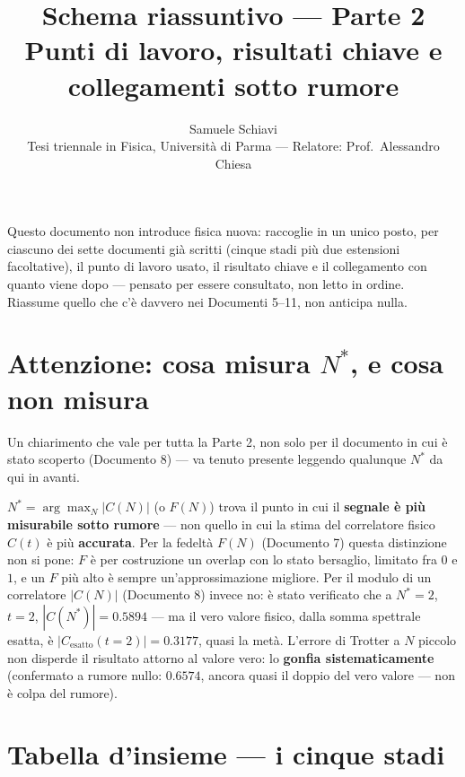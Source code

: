 \documentclass[11pt,a4paper]{article}
\title{\bfseries Schema riassuntivo --- Parte 2\\[2pt]
\large Punti di lavoro, risultati chiave e collegamenti sotto rumore}
\author{Samuele Schiavi \\ \small Tesi triennale in Fisica, Università di Parma
--- Relatore: Prof.\ Alessandro Chiesa}
\date{}
\begin{document}
\maketitle
\thispagestyle{fancy}

Questo documento non introduce fisica nuova: raccoglie in un unico posto,
per ciascuno dei sette documenti già scritti (cinque stadi più due
estensioni facoltative), il punto di lavoro usato, il risultato chiave e
il collegamento con quanto viene dopo --- pensato per essere consultato,
non letto in ordine. Riassume quello che c'è davvero nei Documenti 5--11,
non anticipa nulla.

\section*{Attenzione: cosa misura $N^*$, e cosa non misura}

Un chiarimento che vale per tutta la Parte 2, non solo per il documento in
cui è stato scoperto (Documento 8) --- va tenuto presente leggendo
qualunque $N^*$ da qui in avanti.

$N^*=\arg\max_N|C(N)|$ (o $F(N)$) trova il punto in cui il \textbf{segnale
è più misurabile sotto rumore} --- non quello in cui la stima del
correlatore fisico $C(t)$ è più \textbf{accurata}. Per la fedeltà $F(N)$
(Documento 7) questa distinzione non si pone: $F$ è per costruzione un
overlap con lo stato bersaglio, limitato fra $0$ e $1$, e un $F$ più alto
è sempre un'approssimazione migliore. Per il modulo di un correlatore
$|C(N)|$ (Documento 8) invece no: è stato verificato che a $N^*=2$,
$t=2$, $|C(N^*)|=0.5894$ --- ma il vero valore fisico, dalla somma
spettrale esatta, è $|C_\text{esatto}(t{=}2)|=0.3177$, quasi la metà.
L'errore di Trotter a $N$ piccolo non disperde il risultato attorno al
valore vero: lo \textbf{gonfia sistematicamente} (confermato a rumore
nullo: $0.6574$, ancora quasi il doppio del vero valore --- non è colpa
del rumore).


\section{Tabella d'insieme --- i cinque stadi}
\end{document}
